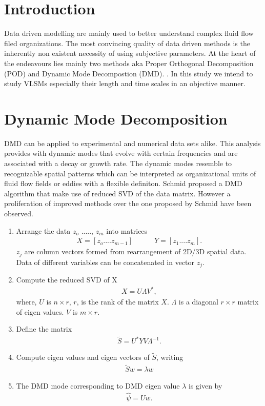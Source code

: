 \documentclass{article}
\begin{document}
\section*{Introduction}
Data driven modelling are mainly used to better understand complex fluid flow filed organizations. The most convincing quality of data driven methods is the inherently non existent necessity of using subjective parameters. At the heart of the endeavours lies mainly two methods aka Proper Orthogonal Decomposition (POD) and Dynamic Mode Decompostion (DMD). \citep{li_bouzeid_blm_2011,bagheri_jfm2013,liu_ExpF_2015}. In this study we intend to study VLSMs especially their length and time scales in an objective manner. 
\section*{Dynamic Mode Decomposition} DMD can be applied to experimental and numerical data sets alike. This analysis provides with dynamic modes that evolve with certain frequencies and are associated with a decay or growth rate. The dynamic modes resemble to recognizable spatial patterns which can be interpreted as organizational units of fluid flow fields or eddies with a flexible definiton. Schmid proposed a DMD algorithm that make use of reduced SVD of the data matrix. However a proliferation of improved methods over the one proposed by Schmid have been observed. 
\begin{enumerate}
  \item Arrange the data {$z_o$ ....., $z_{m}$} into matrices
    \begin{align*}
        X  = [z_o .... z_{m-1}] \quad \quad \quad Y =[z_1 .... z_m].
    \end{align*}
        $z_j$ are column vectors formed from rearrangement of 2D/3D spatial data. Data of different variables can be concatenated in vector $z_j$.
  \item Compute the reduced SVD of X
      \begin{align*}      X = U\Lambda V^{*},        \end{align*}
  where, $U$ is $n \times r$, $r$, is the rank of the matrix $X$. $\Lambda$ is a diagonal $r \times r$ matrix of eigen values. $V$ is $m \times r$.
  \item Define the matrix 
    \begin{align*} \tilde{S} = U^{*}YV\Lambda^{-1}. \end{align*}
  \item Compute eigen values and eigen vectors of $\tilde{S}$, writing
    \begin{align*} \tilde{S}w = \lambda w \end{align*}
   \item The DMD mode corresponding to DMD eigen value $\lambda$ is given by
   \begin{align*}  \hat{\psi} = Uw.\end{align*}
\end{enumerate}
\end{document}
